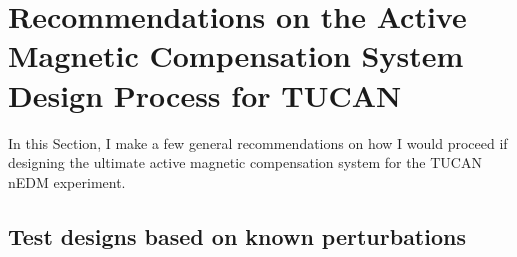 \section{Recommendations on the Active Magnetic Compensation System Design Process for TUCAN}


In this Section, I make a few general recommendations on how I would proceed if designing the ultimate active magnetic compensation system for the TUCAN nEDM experiment.


\subsection{Test designs based on known perturbations\label{sec:sources}}


